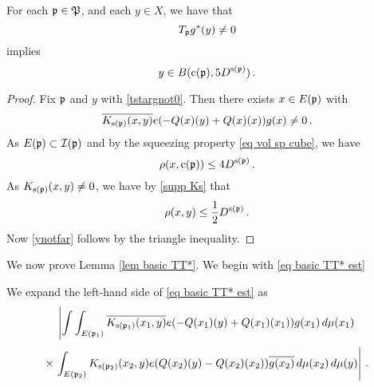 \begin{lemma}\label{lem tstarsupport}
    For each $\mathfrak p\in \mathfrak P$, and each $y\in X$, we have that
\begin{equation}\label{tstargnot0}
        T_{\mathfrak p} g^*(y)\neq 0
\end{equation}
    implies
\begin{equation}\label{ynotfar}
    y\in  B(\mathrm{c}(\mathfrak p),5D^{\mathrm{s}(\mathfrak p)})\, .
\end{equation}
\end{lemma}
\begin{proof}
Fix $\mathfrak p$ and $y$ with \eqref{tstargnot0}.
Then there exists $x\in E(\mathfrak p)$ with
\begin{equation}
    \overline{K_{\mathrm{s}(\mathfrak p)}(x,y)}e(-{Q}(x)(y)
    +{Q}(x)(x))g(x) \neq 0\, .
\end{equation}
As $E(\mathfrak p)\subset \mathcal{I}(\mathfrak p)$ and by the squeezing property
\eqref{eq vol sp cube}, we have
\begin{equation}
    \rho(x,\mathrm{c}(\mathfrak p))\le 4D^{\mathrm{s}(\mathfrak p)}\, .
\end{equation}
As $K_{\mathrm{s}(\mathfrak p)}(x,y)\neq 0$, we have by  \eqref{supp Ks}
that
\begin{equation}
\rho(x,y)\le \frac 12 D^{\mathrm{s}(\mathfrak p)}\, .
\end{equation}
Now \eqref{ynotfar} follows by the triangle inequality.
\end{proof}


We now prove Lemma \ref{lem basic TT*}. We begin with  \eqref{eq basic TT* est}

We expand the left-hand side of \eqref{eq basic TT* est} as
\begin{equation}\label{tstartstar}
\left|\int \int_{E(\mathfrak p_1)} \overline{K_{\mathrm{s}(\mathfrak p_1)}(x_1,y)}e(-{Q}(x_1)(y)+
    {Q}(x_1)(x_1))g(x_1)\, d\mu(x_1) \right.
\end{equation}
\begin{equation}
    \times \left.\int_{E(\mathfrak p_2)} {K_{\mathrm{s}(\mathfrak p_2)}(x_2,y)}e({Q}(x_2)(y)
    -{Q}(x_2)(x_2))\overline{g(x_2)}\, d\mu(x_2)\, d\mu(y)\right|\, .
\end{equation}

